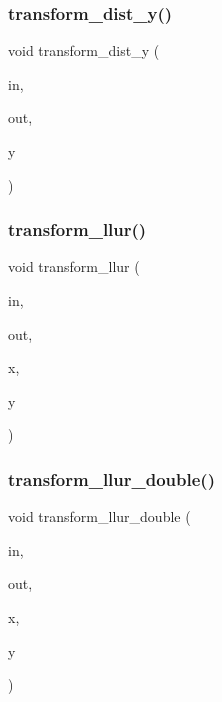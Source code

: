\subsubsection{\texorpdfstring{transform\+\_\+dist\+\_\+y()}{transform\_dist\_y()}}
{\footnotesize\ttfamily void transform\+\_\+dist\+\_\+y (\begin{DoxyParamCaption}\item[{\mbox{\hyperlink{galois_8h_a09fddde158a3a20bd2dcadb609de11dc}{I\+NT}} $\ast$}]{in,  }\item[{\mbox{\hyperlink{galois_8h_a09fddde158a3a20bd2dcadb609de11dc}{I\+NT}} $\ast$}]{out,  }\item[{\mbox{\hyperlink{galois_8h_a09fddde158a3a20bd2dcadb609de11dc}{I\+NT}} \&}]{y }\end{DoxyParamCaption})}

\mbox{\label{draw_8_c_af38b139f64e19404b9a944c7188d4aff}} 
\subsubsection{\texorpdfstring{transform\+\_\+llur()}{transform\_llur()}}
{\footnotesize\ttfamily void transform\+\_\+llur (\begin{DoxyParamCaption}\item[{\mbox{\hyperlink{galois_8h_a09fddde158a3a20bd2dcadb609de11dc}{I\+NT}} $\ast$}]{in,  }\item[{\mbox{\hyperlink{galois_8h_a09fddde158a3a20bd2dcadb609de11dc}{I\+NT}} $\ast$}]{out,  }\item[{\mbox{\hyperlink{galois_8h_a09fddde158a3a20bd2dcadb609de11dc}{I\+NT}} \&}]{x,  }\item[{\mbox{\hyperlink{galois_8h_a09fddde158a3a20bd2dcadb609de11dc}{I\+NT}} \&}]{y }\end{DoxyParamCaption})}

\mbox{\label{draw_8_c_aafa3dc4bd10b5c0c89fa354b0d87f865}} 
\subsubsection{\texorpdfstring{transform\+\_\+llur\+\_\+double()}{transform\_llur\_double()}}
{\footnotesize\ttfamily void transform\+\_\+llur\+\_\+double (\begin{DoxyParamCaption}\item[{double $\ast$}]{in,  }\item[{double $\ast$}]{out,  }\item[{double \&}]{x,  }\item[{double \&}]{y }\end{DoxyParamCaption})}

